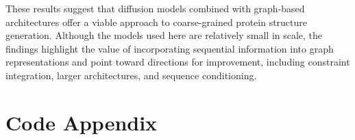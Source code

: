 \documentclass[a4paper,12pt]{article}
\begin{document}
These results suggest that diffusion models combined with graph-based architectures offer a viable approach to coarse-grained protein structure generation. Although the models used here are relatively small in scale, the findings highlight the value of incorporating sequential information into graph representations and point toward directions for improvement, including constraint integration, larger architectures, and sequence conditioning.

\clearpage

\appendix
\section{Code Appendix}



\end{document}
